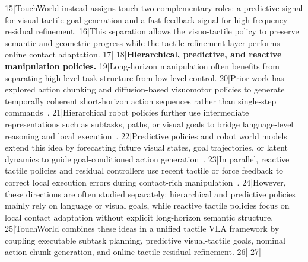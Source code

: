 15|TouchWorld instead assigns touch two complementary roles: a predictive signal for visual-tactile goal generation and a fast feedback signal for high-frequency residual refinement.
16|This separation allows the visuo-tactile policy to preserve semantic and geometric progress while the tactile refinement layer performs online contact adaptation.
17|
18|\noindent\textbf{Hierarchical, predictive, and reactive manipulation policies.}
19|Long-horizon manipulation often benefits from separating high-level task structure from low-level control.
20|Prior work has explored action chunking and diffusion-based visuomotor policies to generate temporally coherent short-horizon action sequences rather than single-step commands~\cite{zhao2023learningfinegrainedbimanualmanipulation,chi2025diffusion,black2025realtimeexecutionactionchunking}.
21|Hierarchical robot policies further use intermediate representations such as subtasks, paths, or visual goals to bridge language-level reasoning and local execution~\cite{li2025hamsterhierarchicalactionmodels}.
22|Predictive policies and robot world models extend this idea by forecasting future visual states, goal trajectories, or latent dynamics to guide goal-conditioned action generation~\cite{zhou2025act2goalworldmodelgeneral,zang2026tacforesightforceguidedtactileworld}.
23|In parallel, reactive tactile policies and residual controllers use recent tactile or force feedback to correct local execution errors during contact-rich manipulation~\cite{xue2025reactivediffusionpolicyslowfast,zhao2025touchbeginsvisionends}.
24|However, these directions are often studied separately: hierarchical and predictive policies mainly rely on language or visual goals, while reactive tactile policies focus on local contact adaptation without explicit long-horizon semantic structure.
25|TouchWorld combines these ideas in a unified tactile VLA framework by coupling executable subtask planning, predictive visual-tactile goals, nominal action-chunk generation, and online tactile residual refinement.
26|
27|
